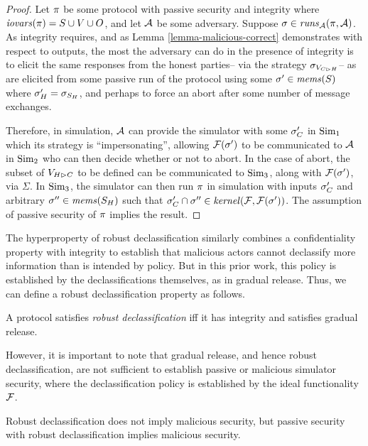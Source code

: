 \begin{proof}
  Let $\pi$ be some protocol with passive security and integrity
  where $\mathit{iovars}(\pi) = S \cup V \cup O$, and let $\mathcal{A}$ be some
  adversary. Suppose $\sigma \in \mathit{runs}_{\mathcal{A}}(\pi,\mathcal{A})$.
  As integrity requires, and as Lemma \ref{lemma-malicious-correct}
  demonstrates with respect to outputs, the most the adversary can do
  in the presence of integrity is to elicit the same responses from
  the honest parties-- via the strategy $\sigma_{V_{C \rhd H}}$-- as
  are elicited from some passive run of the protocol using
  some $\sigma' \in \mathit{mems}(S)$ where $\sigma'_H = \sigma_{S_H}$,
  and perhaps to force an abort after some number of message
  exchanges.

  Therefore, in simulation, $\mathcal{A}$ can provide the simulator
  with some $\sigma'_C$ in $\mathrm{Sim}_1$ which its strategy is ``impersonating'',
  allowing $\mathcal{F}(\sigma')$ to
  be communicated to $\mathcal{A}$ in $\mathrm{Sim}_2$ who can then
  decide whether or not to abort. In the case of abort, the
  subset of $V_{H \rhd C}$ to be defined can be communicated to
  $\mathrm{Sim}_3$, along with $\mathcal{F}(\sigma')$, via $\Sigma$. 
  In $\mathrm{Sim}_3$, the simulator can then run $\pi$ in simulation
  with inputs $\sigma'_C$ and arbitrary $\sigma'' \in \mathit{mems}(S_H)$
  such that $\sigma'_C \cap \sigma'' \in \mathit{kernel}(\mathcal{F},\mathcal{F}(\sigma'))$.
  The assumption of passive security of $\pi$ implies the result.
\end{proof}

The hyperproperty of robust declassification \cite{930133} similarly
combines a confidentiality property with integrity to establish that
malicious actors cannot declassify more information than is intended
by policy. But in this prior work, this policy is established
by the declassifications themselves, as in gradual release.
Thus, we can define a robust declassification property as follows. 
\begin{definition}
  A protocol satisfies \emph{robust declassification} iff it has integrity and
  satisfies gradual release. 
\end{definition}
However, it is important to note that gradual release, and
hence robust declassification, are not sufficient to establish
passive or malicious simulator security, where the declassification
policy is established by the ideal functionality $\mathcal{F}$. 
\begin{theorem}
  Robust declassification does not imply malicious security, but
  passive security with robust declassification implies malicious security.
\end{theorem}

